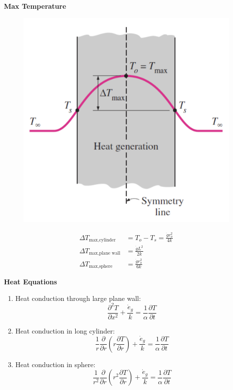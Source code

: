 \large\textbf{Max Temperature}
\begin{figure}[h]
    \centering
    \includegraphics[width=0.75\linewidth]{images/heat_generation_max_temp.png}
\end{figure}

\begin{align*}
    \Delta T_{\text{max,cylinder}}&= T_o - T_s = \frac{\dot{g}r_o^2}{4k} \\
    \Delta T_{\text{max,plane wall}} &= \frac{\dot{g}L^2}{2k} \\
    \Delta T_{\text{max,sphere}} &= \frac{\dot{g}r_o^2}{6k}
\end{align*}

\large\textbf{Heat Equations}
\begin{enumerate}
    \item Heat conduction through \color{red} large plane wall: \color{black}
    \begin{equation*}
        \frac{\partial^2 T}{\partial x^2} + \frac{\dot{e}_g}{k} = \frac{1}{\alpha} \frac{\partial T}{\partial t}
    \end{equation*}
    \item Heat conduction in \color{red} long cylinder: \color{black}
    \begin{equation*}
        \frac{1}{r} \frac{\partial}{\partial r}\left(r \frac{\partial T}{\partial r}\right) + \frac{\dot{e}_g}{k} = \frac{1}{\alpha} \frac{\partial T}{\partial t}
    \end{equation*}
    \item Heat conduction in \color{red} sphere: \color{black}
    \begin{equation*}
        \frac{1}{r^2} \frac{\partial}{\partial r} \left( r^2 \frac{\partial T}{\partial r}\right) + \frac{\dot{e}_g}{k} = \frac{1}{\alpha} \frac{\partial T}{\partial t}
    \end{equation*}
\end{enumerate}

